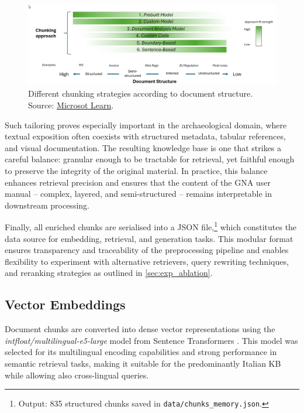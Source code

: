 \begin{spacing}{1.5}
\vspace{0.8em}
\begin{figure}[H]
  \centering
  \includegraphics[width=\textwidth]{images/chunking-approaches-by-document-structure.png} 
  \caption{Different chunking strategies according to document structure.\\
  \footnotesize{Source: \href{https://web.archive.org/web/20250825093743/https://learn.microsoft.com/en-us/azure/architecture/ai-ml/guide/rag/rag-chunking-phase}{Microsot Learn}}.}
  \label{fig:chunking_approach}
\end{figure}

Such tailoring proves especially important in the archaeological domain, where textual exposition often coexists with structured metadata, tabular references, and visual documentation. The resulting knowledge base is one that strikes a careful balance: granular enough to be tractable for retrieval, yet faithful enough to preserve the integrity of the original material. In practice, this balance enhances retrieval precision and ensures that the content of the GNA user manual -- complex, layered, and semi-structured -- remains interpretable in downstream processing.

Finally, all enriched chunks are serialised into a JSON file,\footnote{Output: 835 structured chunks saved in \texttt{data/chunks\_memory.json}.} which constitutes the data source for embedding, retrieval, and generation tasks. This modular format ensures transparency and traceability of the preprocessing pipeline and enables flexibility to experiment with alternative retrievers, query rewriting techniques, and reranking strategies as outlined in \autoref{sec:exp_ablation}.

\sloppy
\subsection{Vector Embeddings}
Document chunks are converted into dense vector representations using the \textit{intfloat/multilingual-e5-large} model from Sentence Transformers \parencite{wang_multilingual_2024}. This model was selected for its multilingual encoding capabilities and strong performance in semantic retrieval tasks, making it suitable for the predominantly Italian KB while allowing also cross-lingual queries. 


\end{spacing}
